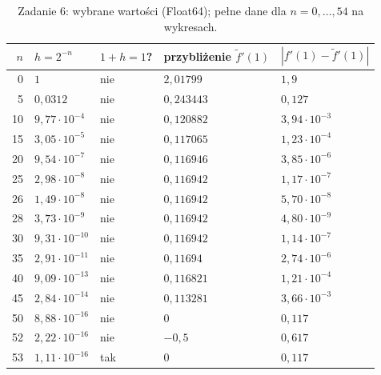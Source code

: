\documentclass[11pt,a4paper]{article}
\begin{document}
\begin{table}[h]
\centering\footnotesize
\begin{tabular}{@{}rllll@{}}
\toprule
$n$ & $h=2^{-n}$ & $1+h=1$? & przybliżenie $\tilde f'(1)$ & $|f'(1)-\tilde f'(1)|$ \\
\midrule
0 & $1$ & nie & $2{,}01799$ & $1{,}9$ \\
5 & $0{,}0312$ & nie & $0{,}243443$ & $0{,}127$ \\
10 & $9{,}77\cdot10^{-4}$ & nie & $0{,}120882$ & $3{,}94\cdot10^{-3}$ \\
15 & $3{,}05\cdot10^{-5}$ & nie & $0{,}117065$ & $1{,}23\cdot10^{-4}$ \\
20 & $9{,}54\cdot10^{-7}$ & nie & $0{,}116946$ & $3{,}85\cdot10^{-6}$ \\
25 & $2{,}98\cdot10^{-8}$ & nie & $0{,}116942$ & $1{,}17\cdot10^{-7}$ \\
26 & $1{,}49\cdot10^{-8}$ & nie & $0{,}116942$ & $5{,}70\cdot10^{-8}$ \\
28 & $3{,}73\cdot10^{-9}$ & nie & $0{,}116942$ & $4{,}80\cdot10^{-9}$ \\
30 & $9{,}31\cdot10^{-10}$ & nie & $0{,}116942$ & $1{,}14\cdot10^{-7}$ \\
35 & $2{,}91\cdot10^{-11}$ & nie & $0{,}11694$ & $2{,}74\cdot10^{-6}$ \\
40 & $9{,}09\cdot10^{-13}$ & nie & $0{,}116821$ & $1{,}21\cdot10^{-4}$ \\
45 & $2{,}84\cdot10^{-14}$ & nie & $0{,}113281$ & $3{,}66\cdot10^{-3}$ \\
50 & $8{,}88\cdot10^{-16}$ & nie & $0$ & $0{,}117$ \\
52 & $2{,}22\cdot10^{-16}$ & nie & $-0{,}5$ & $0{,}617$ \\
53 & $1{,}11\cdot10^{-16}$ & tak & $0$ & $0{,}117$ \\
\bottomrule
\end{tabular}
\caption{Zadanie 6: wybrane wartości (Float64); pełne dane dla $n=0,\dots,54$ na wykresach.}
\end{table}
\end{document}
